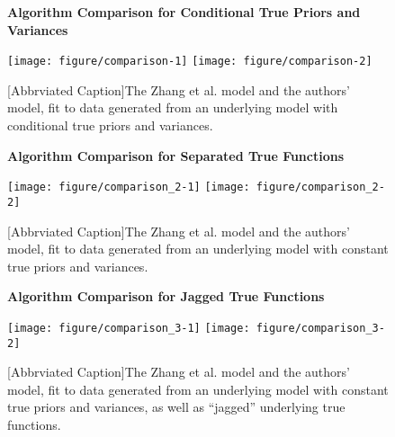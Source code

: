 \documentclass[10pt]{olplainarticle}\usepackage[]{graphicx}\usepackage[]{color}
\newenvironment{knitrout}{}{} %
\begin{document}
\begin{figure}[H]
\centering
    \textbf{Algorithm Comparison for Conditional True Priors and Variances}\par\medskip
\begin{knitrout}
\color{fgcolor}

{\centering \texttt{[image: figure/comparison-1]} 
\texttt{[image: figure/comparison-2]} 

}



\end{knitrout}
[Abbrviated Caption]{The Zhang et al. model and the authors' model, fit to data generated from an underlying model with conditional true priors and variances.} \label{fig:comparison}
\end{figure}



\begin{figure}[H]
\centering
    \textbf{Algorithm Comparison for Separated True Functions}\par\medskip
\begin{knitrout}
\color{fgcolor}

{\centering \texttt{[image: figure/comparison\_2-1]} 
\texttt{[image: figure/comparison\_2-2]} 

}



\end{knitrout}
[Abbrviated Caption]{The Zhang et al. model and the authors' model, fit to data generated from an underlying model with constant true priors and variances.} \label{fig:comparison_2}
\end{figure}

\begin{figure}[H]
\centering
    \textbf{Algorithm Comparison for Jagged True Functions}\par\medskip
\begin{knitrout}
\color{fgcolor}

{\centering \texttt{[image: figure/comparison\_3-1]} 
\texttt{[image: figure/comparison\_3-2]} 

}



\end{knitrout}
[Abbrviated Caption]{The Zhang et al. model and the authors' model, fit to data generated from an underlying model with constant true priors and variances, as well as ``jagged'' underlying true functions.} \label{fig:comparison_3}
\end{figure}
\end{document}

